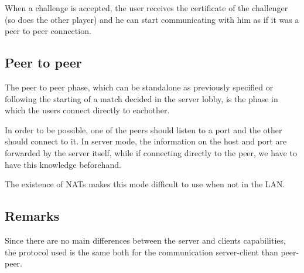 When a challenge is accepted, the user receives the certificate of the challenger (so does the other player) and he can start communicating with him as if it was a peer to peer connection.

\subsection{Peer to peer}
The peer to peer phase, which can be standalone as previously specified or following the starting of a match decided in the server lobby, is the phase in which the users connect directly to eachother.

In order to be possible, one of the peers should listen to a port and the other should connect to it. In server mode, the information on the host and port are forwarded by the server itself, while if connecting directly to the peer, we have to have this knowledge beforehand.

The existence of NATs makes this mode difficult to use when not in the LAN.

\subsection{Remarks}
Since there are no main differences between the server and clients capabilities, the protocol used is the same both for the communication server-client than peer-peer.




